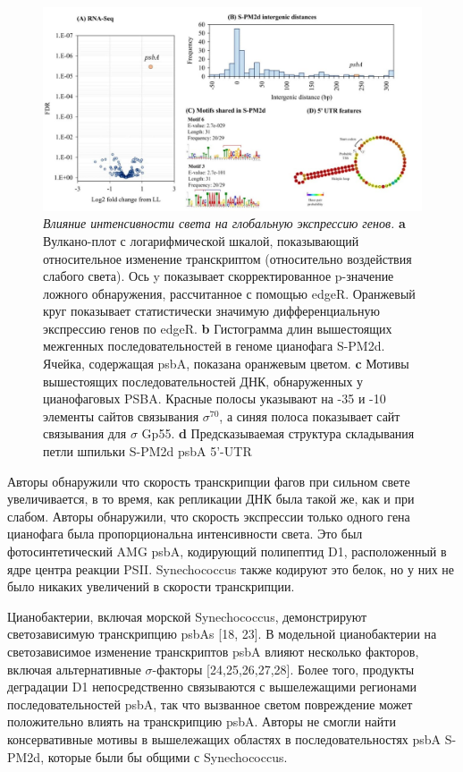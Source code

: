 \documentclass[14pt]{extarticle}
\begin{document}
    \begin{figure}[]
            \centering
            \includegraphics[width=\textwidth]{img/protein.jpg}
            \caption{\textit{Влияние интенсивности света на глобальную экспрессию генов.} \textbf{a} Вулкано-плот с
            логарифмической шкалой, показывающий относительное изменение транскриптом (относительно воздействия слабого
            света). Ось y показывает скорректированное p-значение ложного обнаружения, рассчитанное с помощью edgeR.
            Оранжевый круг показывает статистически значимую дифференциальную экспрессию генов по edgeR. \textbf{b}
            Гистограмма длин вышестоящих межгенных последовательностей в геноме цианофага S-PM2d. Ячейка, содержащая
            psbA, показана оранжевым цветом. \textbf{c} Мотивы вышестоящих последовательностей ДНК, обнаруженных у
            цианофаговых PSBA. Красные полосы указывают на -35 и -10 элементы сайтов связывания $\sigma^{70}$, а синяя
            полоса показывает сайт связывания для $\sigma$ Gp55. \textbf{d} Предсказываемая структура складывания петли
            шпильки S-PM2d psbA 5'-UTR \cite{puxty-evanx}}
            \label{fig:skybox}
    \end{figure}
    
    \par{Авторы обнаружили что скорость транскрипции фагов при сильном свете увеличивается, в то время, как репликации
    ДНК была такой же, как и при слабом. Авторы обнаружили, что скорость экспрессии только одного гена цианофага была
    пропорциональна интенсивности света. Это был фотосинтетический AMG psbA, кодирующий полипептид D1, расположенный в
    ядре центра реакции PSII. Synechococcus также кодируют это белок, но у них не было никаких увеличений в скорости 
    транскрипции. \cite{puxty-evanx}}
    
    \par{Цианобактерии, включая морской Synechococcus, демонстрируют светозависимую транскрипцию psbAs [18, 23]. В 
    модельной цианобактерии на светозависимое изменение транскриптов psbA влияют несколько факторов, включая 
    альтернативные $\sigma$-факторы [24,25,26,27,28]. Более того, продукты деградации D1 непосредственно связываются с 
    вышележащими регионами последовательностей psbA, так что вызванное светом повреждение может положительно влиять на 
    транскрипцию psbA. Авторы не смогли найти консервативные мотивы в вышележащих областях в последовательностях psbA 
    S-PM2d, которые были бы общими с Synechococcus.} 
    
\end{document}

